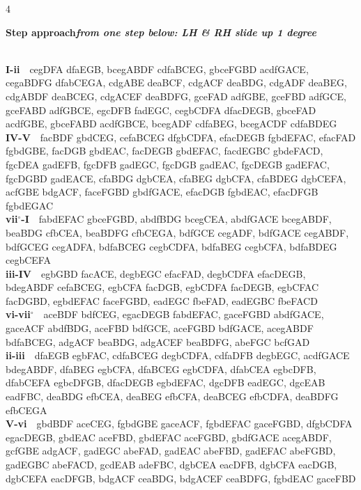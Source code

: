 \documentclass[letterpaper,12pt]{article}
\begin{document}
\begin{multicols}{4}
\noindent\colorbox{hdr5}{\begin{minipage}{\dimexpr\linewidth-2\fboxsep\relax}\raggedright\color{white}\bfseries Step approach\quad\normalfont\itshape from one step below: LH \& RH slide up 1 degree\end{minipage}}\\[0.1mm]
\noindent\hangindent=0.25in {\color{lhcol}\bfseries I-ii}~~{\ttfamily cegDFA dfaEGB, bcegABDF cdfaBCEG, gbceFGBD acdfGACE, cegaBDFG dfabCEGA, cdgABE deaBCF, cdgACF deaBDG, cdgADF deaBEG, cdgABDF deaBCEG, cdgACEF deaBDFG, gceFAD adfGBE, gceFBD adfGCE, gceFABD adfGBCE, egcDFB fadEGC, cegbCDFA dfacDEGB, gbceFAD acdfGBE, gbceFABD acdfGBCE, bcegADF cdfaBEG, bcegACDF cdfaBDEG}\\[0.1mm]
\noindent\hangindent=0.25in {\color{lhcol}\bfseries IV-V}~~{\ttfamily facBDF gbdCEG, cefaBCEG dfgbCDFA, efacDEGB fgbdEFAC, efacFAD fgbdGBE, facDGB gbdEAC, facDEGB gbdEFAC, facdEGBC gbdeFACD, fgcDEA gadEFB, fgcDFB gadEGC, fgcDGB gadEAC, fgcDEGB gadEFAC, fgcDGBD gadEACE, cfaBDG dgbCEA, cfaBEG dgbCFA, cfaBDEG dgbCEFA, acfGBE bdgACF, faceFGBD gbdfGACE, efacDGB fgbdEAC, efacDFGB fgbdEGAC}\\[0.1mm]
\noindent\hangindent=0.25in {\color{lhcol}\bfseries vii$^\circ$-I}~~{\ttfamily fabdEFAC gbceFGBD, abdfBDG bcegCEA, abdfGACE bcegABDF, beaBDG cfbCEA, beaBDFG cfbCEGA, bdfGCE cegADF, bdfGACE cegABDF, bdfGCEG cegADFA, bdfaBCEG cegbCDFA, bdfaBEG cegbCFA, bdfaBDEG cegbCEFA}\\[0.1mm]
\noindent\hangindent=0.25in {\color{lhcol}\bfseries iii-IV}~~{\ttfamily egbGBD facACE, degbEGC efacFAD, degbCDFA efacDEGB, bdegABDF cefaBCEG, egbCFA facDGB, egbCDFA facDEGB, egbCFAC facDGBD, egbdEFAC faceFGBD, eadEGC fbeFAD, eadEGBC fbeFACD}\\[0.1mm]
\noindent\hangindent=0.25in {\color{lhcol}\bfseries vi-vii$^\circ$}~~{\ttfamily aceBDF bdfCEG, egacDEGB fabdEFAC, gaceFGBD abdfGACE, gaceACF abdfBDG, aceFBD bdfGCE, aceFGBD bdfGACE, acegABDF bdfaBCEG, adgACF beaBDG, adgACEF beaBDFG, abeFGC bcfGAD}\\[0.1mm]
\noindent\hangindent=0.25in {\color{lhcol}\bfseries ii-iii}~~{\ttfamily dfaEGB egbFAC, cdfaBCEG degbCDFA, cdfaDFB degbEGC, acdfGACE bdegABDF, dfaBEG egbCFA, dfaBCEG egbCDFA, dfabCEA egbcDFB, dfabCEFA egbcDFGB, dfacDEGB egbdEFAC, dgcDFB eadEGC, dgcEAB eadFBC, deaBDG efbCEA, deaBEG efbCFA, deaBCEG efbCDFA, deaBDFG efbCEGA}\\[0.1mm]
\noindent\hangindent=0.25in {\color{lhcol}\bfseries V-vi}~~{\ttfamily gbdBDF aceCEG, fgbdGBE gaceACF, fgbdEFAC gaceFGBD, dfgbCDFA egacDEGB, gbdEAC aceFBD, gbdEFAC aceFGBD, gbdfGACE acegABDF, gcfGBE adgACF, gadEGC abeFAD, gadEAC abeFBD, gadEFAC abeFGBD, gadEGBC abeFACD, gcdEAB adeFBC, dgbCEA eacDFB, dgbCFA eacDGB, dgbCEFA eacDFGB, bdgACF ceaBDG, bdgACEF ceaBDFG, fgbdEAC gaceFBD}\\[0.1mm]
\vspace{1.5mm}


\end{multicols}
\end{document}
